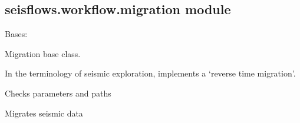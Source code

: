 \documentclass[letterpaper,10pt,english]{sphinxmanual}
\begin{document}
\subsection{seisflows.workflow.migration module}
\label{\detokenize{ref/seisflows.workflow:module-seisflows.workflow.migration}}\label{\detokenize{ref/seisflows.workflow:seisflows-workflow-migration-module}}

\begin{fulllineitems}
\label{\detokenize{ref/seisflows.workflow:seisflows.workflow.migration.migration}}
Bases: {\hyperref[\detokenize{ref/seisflows.workflow:seisflows.workflow.base.base}]{}}

Migration base class.

In the terminology of seismic exploration, implements a
‘reverse time migration’.

\begin{fulllineitems}
\label{\detokenize{ref/seisflows.workflow:seisflows.workflow.migration.migration.check}}
Checks parameters and paths

\end{fulllineitems}


\begin{fulllineitems}
\label{\detokenize{ref/seisflows.workflow:seisflows.workflow.migration.migration.main}}
Migrates seismic data

\end{fulllineitems}



\end{fulllineitems}
\end{document}
